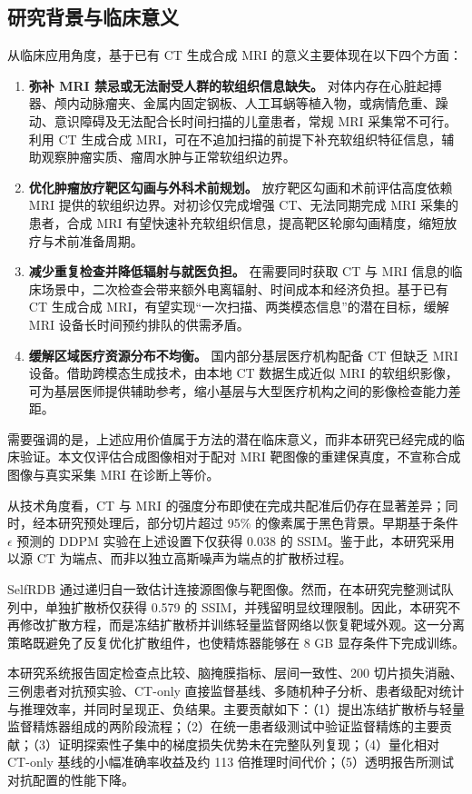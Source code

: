 \documentclass[UTF8,12pt,a4paper,twocolumn]{ctexart}
\begin{document}
\subsection{研究背景与临床意义}
从临床应用角度，基于已有 CT 生成合成 MRI 的意义主要体现在以下四个方面：
\begin{enumerate}
\item \textbf{弥补 MRI 禁忌或无法耐受人群的软组织信息缺失。} 对体内存在心脏起搏器、颅内动脉瘤夹、金属内固定钢板、人工耳蜗等植入物，或病情危重、躁动、意识障碍及无法配合长时间扫描的儿童患者，常规 MRI 采集常不可行。利用 CT 生成合成 MRI，可在不追加扫描的前提下补充软组织特征信息，辅助观察肿瘤实质、瘤周水肿与正常软组织边界。
\item \textbf{优化肿瘤放疗靶区勾画与外科术前规划。} 放疗靶区勾画和术前评估高度依赖 MRI 提供的软组织边界。对初诊仅完成增强 CT、无法同期完成 MRI 采集的患者，合成 MRI 有望快速补充软组织信息，提高靶区轮廓勾画精度，缩短放疗与术前准备周期。
\item \textbf{减少重复检查并降低辐射与就医负担。} 在需要同时获取 CT 与 MRI 信息的临床场景中，二次检查会带来额外电离辐射、时间成本和经济负担。基于已有 CT 生成合成 MRI，有望实现“一次扫描、两类模态信息”的潜在目标，缓解 MRI 设备长时间预约排队的供需矛盾。
\item \textbf{缓解区域医疗资源分布不均衡。} 国内部分基层医疗机构配备 CT 但缺乏 MRI 设备。借助跨模态生成技术，由本地 CT 数据生成近似 MRI 的软组织影像，可为基层医师提供辅助参考，缩小基层与大型医疗机构之间的影像检查能力差距。
\end{enumerate}
需要强调的是，上述应用价值属于方法的潜在临床意义，而非本研究已经完成的临床验证。本文仅评估合成图像相对于配对 MRI 靶图像的重建保真度，不宣称合成图像与真实采集 MRI 在诊断上等价。

从技术角度看，CT 与 MRI 的强度分布即使在完成共配准后仍存在显著差异；同时，经本研究预处理后，部分切片超过 95\% 的像素属于黑色背景。早期基于条件 $\epsilon$ 预测的 DDPM 实验在上述设置下仅获得 0.038 的 SSIM。鉴于此，本研究采用以源 CT 为端点、而非以独立高斯噪声为端点的扩散桥过程。

SelfRDB 通过递归自一致估计连接源图像与靶图像\cite{arslan2025selfrdb}。然而，在本研究完整测试队列中，单独扩散桥仅获得 0.579 的 SSIM，并残留明显纹理限制。因此，本研究不再修改扩散方程，而是冻结扩散桥并训练轻量监督网络以恢复靶域外观。这一分离策略既避免了反复优化扩散组件，也使精炼器能够在 8 GB 显存条件下完成训练。

本研究系统报告固定检查点比较、脑掩膜指标、层间一致性、200 切片损失消融、三例患者对抗预实验、CT-only 直接监督基线、多随机种子分析、患者级配对统计与推理效率，并同时呈现正、负结果。主要贡献如下：（1）提出冻结扩散桥与轻量监督精炼器组成的两阶段流程；（2）在统一患者级测试中验证监督精炼的主要贡献；（3）证明探索性子集中的梯度损失优势未在完整队列复现；（4）量化相对 CT-only 基线的小幅准确率收益及约 113 倍推理时间代价；（5）透明报告所测试对抗配置的性能下降。
\end{document}
